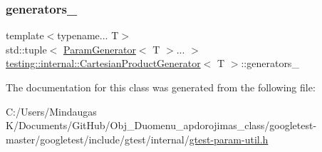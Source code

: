 \subsubsection{\texorpdfstring{generators\_}{generators\_}}
{\footnotesize\ttfamily template$<$typename... T$>$ \\
std\+::tuple$<$ \mbox{\hyperlink{classtesting_1_1internal_1_1_param_generator}{Param\+Generator}}$<$ T $>$... $>$ \mbox{\hyperlink{classtesting_1_1internal_1_1_cartesian_product_generator}{testing\+::internal\+::\+Cartesian\+Product\+Generator}}$<$ T $>$\+::generators\+\_\+\hspace{0.3cm}{\ttfamily [private]}}



The documentation for this class was generated from the following file\+:\begin{DoxyCompactItemize}
\item 
C\+:/\+Users/\+Mindaugas K/\+Documents/\+Git\+Hub/\+Obj\+\_\+\+Duomenu\+\_\+apdorojimas\+\_\+class/googletest-\/master/googletest/include/gtest/internal/\mbox{\hyperlink{googletest-master_2googletest_2include_2gtest_2internal_2gtest-param-util_8h}{gtest-\/param-\/util.\+h}}\end{DoxyCompactItemize}
